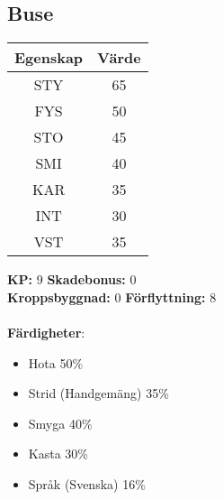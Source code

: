 \subsection{Buse}
\label{var:Buse}
%
\begin{center}
	\begin{tabular}{ | c | c | }
		\hline
		Egenskap & Värde \\
		\hline
		STY & 65 \\
		FYS & 50 \\
		STO & 45 \\
		SMI & 40 \\
		KAR & 35 \\
		INT & 30 \\
		VST & 35 \\
		\hline
	\end{tabular}
\end{center}
%
\textbf{KP:} 9 \quad \textbf{Skadebonus:} 0 \\
\textbf{Kroppsbyggnad:} 0 \quad \textbf{Förflyttning:} 8 \\
\\
\textbf{Färdigheter}:
\begin{itemize}
	\item Hota 50\%
	\item Strid (Handgemäng) 35\%
	\item Smyga 40\%
	\item Kasta 30\%
	\item Språk (Svenska) 16\%
\end{itemize}
